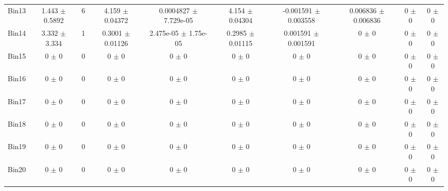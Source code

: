 \begin{tabular}{@{\extracolsep{4pt}}lccccccccc@{}}
     Bin13 & 1.443 $\pm$ 0.5892 & 6 & 4.159 $\pm$ 0.04372 & 0.0004827 $\pm$ 7.729e-05 & 4.154 $\pm$ 0.04304 & -0.001591 $\pm$ 0.003558 & 0.006836 $\pm$ 0.006836 & 0 $\pm$ 0 & 0 $\pm$ 0 \\ 
     Bin14 & 3.332 $\pm$ 3.334 & 1 & 0.3001 $\pm$ 0.01126 & 2.475e-05 $\pm$ 1.75e-05 & 0.2985 $\pm$ 0.01115 & 0.001591 $\pm$ 0.001591 & 0 $\pm$ 0 & 0 $\pm$ 0 & 0 $\pm$ 0 \\ 
     Bin15 & 0 $\pm$ 0 & 0 & 0 $\pm$ 0 & 0 $\pm$ 0 & 0 $\pm$ 0 & 0 $\pm$ 0 & 0 $\pm$ 0 & 0 $\pm$ 0 & 0 $\pm$ 0 \\ 
     Bin16 & 0 $\pm$ 0 & 0 & 0 $\pm$ 0 & 0 $\pm$ 0 & 0 $\pm$ 0 & 0 $\pm$ 0 & 0 $\pm$ 0 & 0 $\pm$ 0 & 0 $\pm$ 0 \\ 
     Bin17 & 0 $\pm$ 0 & 0 & 0 $\pm$ 0 & 0 $\pm$ 0 & 0 $\pm$ 0 & 0 $\pm$ 0 & 0 $\pm$ 0 & 0 $\pm$ 0 & 0 $\pm$ 0 \\ 
     Bin18 & 0 $\pm$ 0 & 0 & 0 $\pm$ 0 & 0 $\pm$ 0 & 0 $\pm$ 0 & 0 $\pm$ 0 & 0 $\pm$ 0 & 0 $\pm$ 0 & 0 $\pm$ 0 \\ 
     Bin19 & 0 $\pm$ 0 & 0 & 0 $\pm$ 0 & 0 $\pm$ 0 & 0 $\pm$ 0 & 0 $\pm$ 0 & 0 $\pm$ 0 & 0 $\pm$ 0 & 0 $\pm$ 0 \\ 
     Bin20 & 0 $\pm$ 0 & 0 & 0 $\pm$ 0 & 0 $\pm$ 0 & 0 $\pm$ 0 & 0 $\pm$ 0 & 0 $\pm$ 0 & 0 $\pm$ 0 & 0 $\pm$ 0 \\ 
\hline\hline
  \end{tabular}
